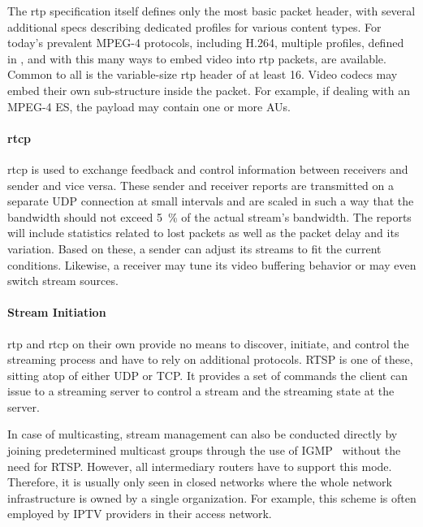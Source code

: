 The \gls{rtp} specification itself defines only the most basic packet header, with several additional specs describing dedicated profiles for various content types. For today's prevalent MPEG-4 protocols, including H.264, multiple profiles, defined in \cite{rfc3640,rfc6184,rfc6416}, and with this many ways to embed video into \gls{rtp} packets, are available. Common to all is the variable-size \gls{rtp} header of at least \SI{16}{\byte}. Video codecs may embed their own sub-structure inside the packet. For example, if dealing with an MPEG-4 \gls{ES}, the payload may contain one or more \glspl{AU}.


\paragraph{\texorpdfstring{\acrshort{rtcp}}{rtcp}}

\gls{rtcp} is used to exchange feedback and control information between receivers and sender and vice versa. These sender and receiver reports are transmitted on a separate \gls{UDP} connection at small intervals and are scaled in such a way that the bandwidth should not exceed \SI{5}{\percent} of the actual stream's bandwidth. The reports will include statistics related to lost packets as well as the packet delay and its variation. Based on these, a sender can adjust its streams to fit the current conditions. Likewise, a receiver may tune its video buffering behavior or may even switch stream sources.


\paragraph{Stream Initiation}

\gls{rtp} and \gls{rtcp} on their own provide no means to discover, initiate, and control the streaming process and have to rely on additional protocols. \gls{RTSP} is one of these, sitting atop of either \gls{UDP} or \gls{TCP}. It provides a set of commands the client can issue to a streaming server to control a stream and the streaming state at the server.

In case of multicasting, stream management can also be conducted directly by joining predetermined multicast groups through the use of \gls{IGMP}~\cite{rfc4604} without the need for \gls{RTSP}. However, all intermediary routers have to support this mode. Therefore, it is usually only seen in closed networks where the whole network infrastructure is owned by a single organization. For example, this scheme is often employed by \gls{IPTV} providers in their access network.

